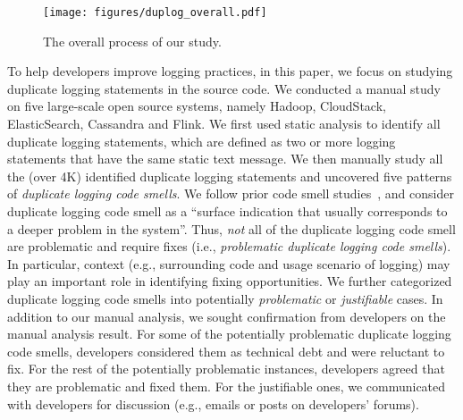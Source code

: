  \begin{figure}
 \centering
\texttt{[image: figures/duplog\_overall.pdf]}
\vspace{-0.6cm}
 \caption{The overall process of our study.}
 \vspace{-0.6cm}
 \label{fig:overall}
 \end{figure}

To help developers improve logging practices, in this paper, we focus on studying duplicate logging statements in the source code. We conducted a manual study on five large-scale open source systems, namely Hadoop, CloudStack, ElasticSearch, Cassandra and Flink. We first used static analysis to identify all duplicate logging statements, which are defined as two or more logging statements that have the same static text message. We then manually study all the (over 4K) identified duplicate logging statements and uncovered five patterns of {\em duplicate logging code smells}. We follow prior code smell studies~\cite{budgen2003software, fowler1999refactoring}, and consider duplicate logging code smell as a ``surface indication that usually corresponds to a deeper problem in the system''. Thus, {\em not} all of the duplicate logging code smell are problematic and require fixes (i.e., {\em problematic duplicate logging code smells}). In particular, context (e.g., surrounding code and usage scenario of logging) may play an important role in identifying fixing opportunities. We further categorized duplicate logging code smells into potentially {\em problematic} or {\em justifiable} cases. In addition to our manual analysis, we sought confirmation from developers on the manual analysis result. For some of the potentially problematic duplicate logging code smells, developers considered them as technical debt and were reluctant to fix. For the rest of the potentially problematic instances, developers agreed that they are problematic and fixed them. For the justifiable ones, we communicated with developers for discussion (e.g., emails or posts on developers' forums).

